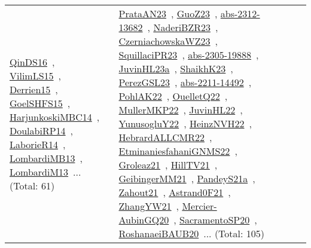 {\begin{longtable}{lp{3cm}>{\raggedright\arraybackslash}p{6cm}>{\raggedright\arraybackslash}p{6cm}>{\raggedright\arraybackslash}p{8cm}}
\href{../works/QinDS16.pdf}{QinDS16}~\cite{QinDS16}, \href{../works/VilimLS15.pdf}{VilimLS15}~\cite{VilimLS15}, \href{../works/Derrien15.pdf}{Derrien15}~\cite{Derrien15}, \href{../works/GoelSHFS15.pdf}{GoelSHFS15}~\cite{GoelSHFS15}, \href{../works/HarjunkoskiMBC14.pdf}{HarjunkoskiMBC14}~\cite{HarjunkoskiMBC14}, \href{../works/DoulabiRP14.pdf}{DoulabiRP14}~\cite{DoulabiRP14}, \href{../works/LaborieR14.pdf}{LaborieR14}~\cite{LaborieR14}, \href{../works/LombardiMB13.pdf}{LombardiMB13}~\cite{LombardiMB13}, \href{../works/LombardiM13.pdf}{LombardiM13}~\cite{LombardiM13}... (Total: 61) & \href{../works/PrataAN23.pdf}{PrataAN23}~\cite{PrataAN23}, \href{../works/GuoZ23.pdf}{GuoZ23}~\cite{GuoZ23}, \href{../works/abs-2312-13682.pdf}{abs-2312-13682}~\cite{abs-2312-13682}, \href{../works/NaderiBZR23.pdf}{NaderiBZR23}~\cite{NaderiBZR23}, \href{../works/CzerniachowskaWZ23.pdf}{CzerniachowskaWZ23}~\cite{CzerniachowskaWZ23}, \href{../works/SquillaciPR23.pdf}{SquillaciPR23}~\cite{SquillaciPR23}, \href{../works/abs-2305-19888.pdf}{abs-2305-19888}~\cite{abs-2305-19888}, \href{../works/JuvinHL23a.pdf}{JuvinHL23a}~\cite{JuvinHL23a}, \href{../works/ShaikhK23.pdf}{ShaikhK23}~\cite{ShaikhK23}, \href{../works/PerezGSL23.pdf}{PerezGSL23}~\cite{PerezGSL23}, \href{../works/abs-2211-14492.pdf}{abs-2211-14492}~\cite{abs-2211-14492}, \href{../works/PohlAK22.pdf}{PohlAK22}~\cite{PohlAK22}, \href{../works/OuelletQ22.pdf}{OuelletQ22}~\cite{OuelletQ22}, \href{../works/MullerMKP22.pdf}{MullerMKP22}~\cite{MullerMKP22}, \href{../works/JuvinHL22.pdf}{JuvinHL22}~\cite{JuvinHL22}, \href{../works/YunusogluY22.pdf}{YunusogluY22}~\cite{YunusogluY22}, \href{../works/HeinzNVH22.pdf}{HeinzNVH22}~\cite{HeinzNVH22}, \href{../works/HebrardALLCMR22.pdf}{HebrardALLCMR22}~\cite{HebrardALLCMR22}, \href{../works/EtminaniesfahaniGNMS22.pdf}{EtminaniesfahaniGNMS22}~\cite{EtminaniesfahaniGNMS22}, \href{../works/Groleaz21.pdf}{Groleaz21}~\cite{Groleaz21}, \href{../works/HillTV21.pdf}{HillTV21}~\cite{HillTV21}, \href{../works/GeibingerMM21.pdf}{GeibingerMM21}~\cite{GeibingerMM21}, \href{../works/PandeyS21a.pdf}{PandeyS21a}~\cite{PandeyS21a}, \href{../works/Zahout21.pdf}{Zahout21}~\cite{Zahout21}, \href{../works/Astrand0F21.pdf}{Astrand0F21}~\cite{Astrand0F21}, \href{../works/ZhangYW21.pdf}{ZhangYW21}~\cite{ZhangYW21}, \href{../works/Mercier-AubinGQ20.pdf}{Mercier-AubinGQ20}~\cite{Mercier-AubinGQ20}, \href{../works/SacramentoSP20.pdf}{SacramentoSP20}~\cite{SacramentoSP20}, \href{../works/RoshanaeiBAUB20.pdf}{RoshanaeiBAUB20}~\cite{RoshanaeiBAUB20}... (Total: 105)\\

\end{longtable}}
